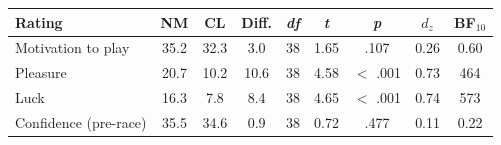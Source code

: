 \begin{tabular}{lcccccccc}
\toprule
Rating & NM & CL & Diff. & \textit{df} & \textit{t} & \textit{p} & $d_z$ & BF$_{10}$ \\
\midrule
Motivation to play & 35.2 & 32.3 & 3.0 & 38 & 1.65 & .107 & 0.26 & 0.60 \\
Pleasure & 20.7 & 10.2 & 10.6 & 38 & 4.58 & $<$ .001 & 0.73 & 464 \\
Luck & 16.3 & 7.8 & 8.4 & 38 & 4.65 & $<$ .001 & 0.74 & 573 \\
Confidence (pre-race) & 35.5 & 34.6 & 0.9 & 38 & 0.72 & .477 & 0.11 & 0.22 \\
\bottomrule
\end{tabular}

